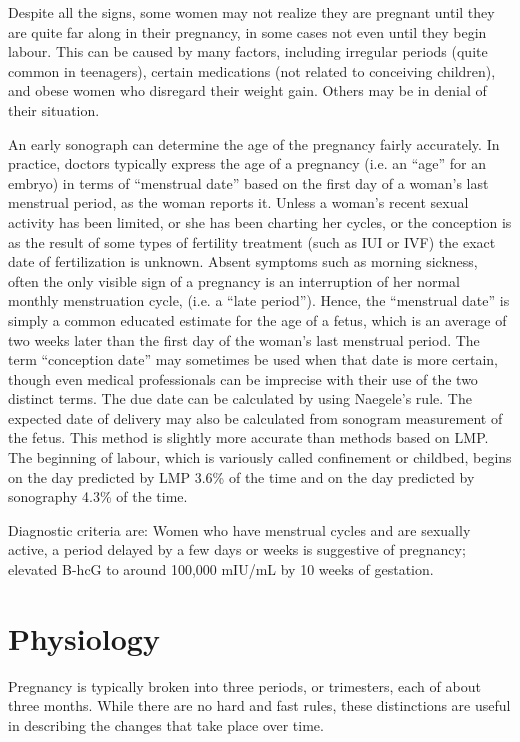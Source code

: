 \documentclass[12pt,a4paper,onecolumn]{article}
\begin{document}
Despite all the signs, some women may not realize they are pregnant until they are quite far along
in their pregnancy, in some cases not even until they begin labour. This can be caused by many
factors, including irregular periods (quite common in teenagers), certain medications (not related
to conceiving children), and obese women who disregard their weight gain. Others may be in denial of
their situation.

An early sonograph can determine the age of the pregnancy fairly accurately. In practice, doctors
typically express the age of a pregnancy (i.e. an ``age'' for an embryo) in terms of ``menstrual
date'' based on the first day of a woman's last menstrual period, as the woman reports it. Unless a
woman's recent sexual activity has been limited, or she has been charting her cycles, or the
conception is as the result of some types of fertility treatment (such as IUI or IVF) the exact date
of fertilization is unknown. Absent symptoms such as morning sickness, often the only visible sign
of a pregnancy is an interruption of her normal monthly menstruation cycle, (i.e. a ``late
period''). Hence, the ``menstrual date'' is simply a common educated estimate for the age of a
fetus, which is an average of two weeks later than the first day of the woman's last menstrual
period. The term ``conception date'' may sometimes be used when that date is more certain, though
even medical professionals can be imprecise with their use of the two distinct terms. The due date
can be calculated by using Naegele's rule. The expected date of delivery may also be calculated from
sonogram measurement of the fetus. This method is slightly more accurate than methods based on LMP.
The beginning of labour, which is variously called confinement or childbed, begins on the day
predicted by LMP 3.6\% of the time and on the day predicted by sonography 4.3\% of the time.

Diagnostic criteria are: Women who have menstrual cycles and are sexually active, a period delayed
by a few days or weeks is suggestive of pregnancy; elevated B-hcG to around 100,000 mIU/mL by 10
weeks of gestation.

\section{Physiology}

Pregnancy is typically broken into three periods, or trimesters, each of about three months. While
there are no hard and fast rules, these distinctions are useful in describing the changes that take
place over time.
\end{document}
